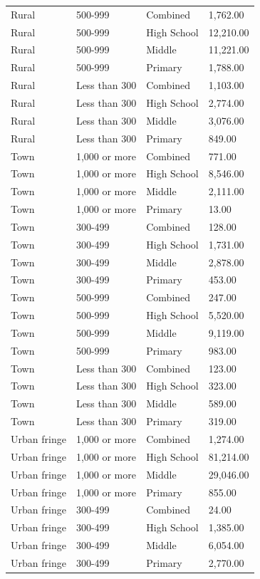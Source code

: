 \documentclass[man]{apa6}
\begin{document}
\begin{table}[tbp]
\begin{center}
\begin{threeparttable}
\begin{tabular}{llll}
Rural & 500-999 & Combined & 1,762.00\\
Rural & 500-999 & High School & 12,210.00\\
Rural & 500-999 & Middle & 11,221.00\\
Rural & 500-999 & Primary & 1,788.00\\
Rural & Less than 300 & Combined & 1,103.00\\
Rural & Less than 300 & High School & 2,774.00\\
Rural & Less than 300 & Middle & 3,076.00\\
Rural & Less than 300 & Primary & 849.00\\
Town & 1,000 or more & Combined & 771.00\\
Town & 1,000 or more & High School & 8,546.00\\
Town & 1,000 or more & Middle & 2,111.00\\
Town & 1,000 or more & Primary & 13.00\\
Town & 300-499 & Combined & 128.00\\
Town & 300-499 & High School & 1,731.00\\
Town & 300-499 & Middle & 2,878.00\\
Town & 300-499 & Primary & 453.00\\
Town & 500-999 & Combined & 247.00\\
Town & 500-999 & High School & 5,520.00\\
Town & 500-999 & Middle & 9,119.00\\
Town & 500-999 & Primary & 983.00\\
Town & Less than 300 & Combined & 123.00\\
Town & Less than 300 & High School & 323.00\\
Town & Less than 300 & Middle & 589.00\\
Town & Less than 300 & Primary & 319.00\\
Urban fringe & 1,000 or more & Combined & 1,274.00\\
Urban fringe & 1,000 or more & High School & 81,214.00\\
Urban fringe & 1,000 or more & Middle & 29,046.00\\
Urban fringe & 1,000 or more & Primary & 855.00\\
Urban fringe & 300-499 & Combined & 24.00\\
Urban fringe & 300-499 & High School & 1,385.00\\
Urban fringe & 300-499 & Middle & 6,054.00\\
Urban fringe & 300-499 & Primary & 2,770.00\\

\end{tabular}
\end{threeparttable}
\end{center}
\end{table}
\end{document}

